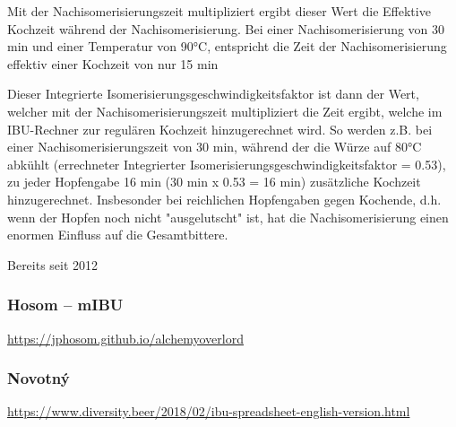 \documentclass[a4paper,parskip=half]{scrartcl}
\begin{document}
Mit der Nachisomerisierungszeit multipliziert ergibt dieser Wert die Effektive Kochzeit während der Nachisomerisierung. Bei einer Nachisomerisierung von 30 min und einer Temperatur von 90°C, entspricht die Zeit der Nachisomerisierung effektiv einer Kochzeit von nur 15 min %


Dieser Integrierte Isomerisierungsgeschwindigkeitsfaktor ist dann der Wert, welcher mit der Nachisomerisierungszeit multipliziert die Zeit ergibt, welche im IBU-Rechner zur regulären Kochzeit hinzugerechnet wird. So werden z.B. bei einer Nachisomerisierungszeit von 30 min, während der die Würze auf 80°C abkühlt (errechneter Integrierter Isomerisierungsgeschwindigkeitsfaktor = 0.53), zu jeder Hopfengabe 16 min (30 min x 0.53 = 16 min) zusätzliche Kochzeit hinzugerechnet. Insbesonder bei reichlichen Hopfengaben gegen Kochende, d.h. wenn der Hopfen noch nicht "ausgelutscht" ist, hat die Nachisomerisierung einen enormen Einfluss auf die Gesamtbittere. 

Bereits seit 2012

\parencite{Wolf2022}

\subsubsection*{Hosom – mIBU}

\url{https://jphosom.github.io/alchemyoverlord}

\parencite{Hosom2015}

\subsubsection*{Novotný}

\url{https://www.diversity.beer/2018/02/ibu-spreadsheet-english-version.html}
\parencite{Novotny2016}
\parencite{Novotny2018}
\end{document}
